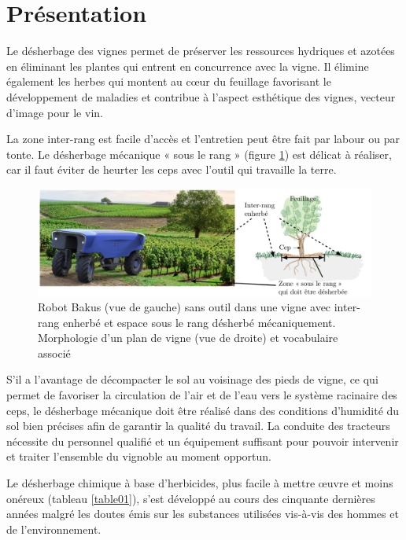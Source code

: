 

\section{Présentation}

Le désherbage des vignes permet de préserver les ressources hydriques et azotées en éliminant les plantes qui entrent en concurrence avec la vigne. Il élimine également les herbes qui montent au cœur du feuillage favorisant
le développement de maladies et contribue à l'aspect esthétique des vignes, vecteur d'image pour le vin.

La zone inter-rang est facile d'accès et l'entretien peut être fait par labour ou par tonte. Le désherbage mécanique « sous le rang » (figure \ref{img01}) est délicat à réaliser, car il faut éviter de heurter les ceps avec l'outil qui travaille la terre.

\begin{figure}[!h]
\centering\includegraphics[width=0.8\linewidth]{img/fig01}
 \caption{Robot Bakus (vue de gauche) sans outil dans une vigne avec inter-rang enherbé et espace sous le rang désherbé mécaniquement. Morphologie d'un plan de vigne (vue de droite) et vocabulaire associé}
 \label{img01}
\end{figure}

S'il a l'avantage de décompacter le sol au voisinage des pieds de vigne, ce qui permet de favoriser la circulation de l'air et de l'eau vers le système racinaire des ceps, le désherbage mécanique doit être réalisé dans des conditions d'humidité du sol bien précises afin de garantir la qualité du travail. La conduite des tracteurs nécessite du personnel qualifié et un équipement suffisant pour pouvoir intervenir et traiter l'ensemble du vignoble au moment opportun.

Le désherbage chimique à base d'herbicides, plus facile à mettre \oe uvre et moins onéreux (tableau \ref{table01}), s'est développé au cours des cinquante dernières années malgré les doutes émis sur les substances utilisées vis-à-vis des hommes et de l'environnement.

